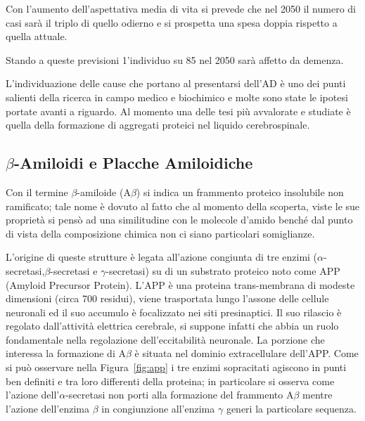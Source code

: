 \documentclass[a4paper, 12pt]{article}
\begin{document}
Con l'aumento dell'aspettativa media di vita si prevede che nel 2050 il numero di casi sarà il triplo di quello odierno e si prospetta una spesa doppia rispetto a quella attuale.\autocite{noauthor_world_2018}

Stando a queste previsioni 1'individuo su 85 nel 2050 sarà affetto da demenza.

L'individuazione delle cause che portano al presentarsi dell'AD è uno dei punti salienti della ricerca in campo medico e biochimico e molte sono state le ipotesi portate avanti a riguardo. Al momento una delle tesi più avvalorate e studiate è quella della formazione di aggregati proteici nel liquido cerebrospinale.

\subsection{\(\beta\)-Amiloidi e Placche Amiloidiche}
\label{sec:ab}
Con il termine \(\beta\)-amiloide (A\(\beta\)) si indica un frammento proteico insolubile non ramificato; tale nome è dovuto al fatto che al momento della scoperta, viste le sue proprietà si pensò ad una similitudine con le molecole d'amido benché dal punto di vista della composizione chimica non ci siano particolari somiglianze.\autocite{lennarz_encyclopedia_2004}

L'origine di queste strutture è legata all'azione congiunta di tre enzimi (\(\alpha\)-secretasi,\(\beta\)-secretasi e \(\gamma\)-secretasi) su di un substrato proteico noto come APP (Amyloid Precursor Protein). L'APP è una proteina trans-membrana di modeste dimensioni (circa 700 residui), viene trasportata lungo l'assone delle cellule neuronali ed il suo accumulo è focalizzato nei siti presinaptici. Il suo rilascio è regolato dall'attività elettrica cerebrale, si suppone infatti che abbia un ruolo fondamentale nella regolazione dell'eccitabilità neuronale.\autocite{mattson_cellular_1997}
La porzione che interessa la formazione di A\(\beta\) è situata nel dominio extracellulare dell'APP. Come si può osservare nella Figura~\ref{fig:app} i tre enzimi sopracitati agiscono in punti ben definiti e tra loro differenti della proteina; in particolare si osserva come l'azione dell'\(\alpha\)-secretasi non porti alla formazione del frammento A\(\beta\)  mentre l'azione dell'enzima \(\beta\) in congiunzione all'enzima \(\gamma\) generi la particolare sequenza.\autocite{goedert_century_2006}
\end{document}
